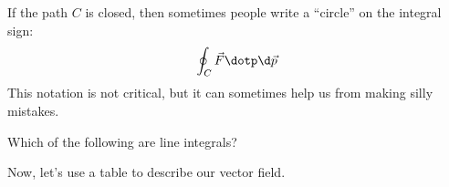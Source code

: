 \documentclass{ximera}
\begin{document}
If the path $C$ is closed, then sometimes people write a ``circle'' on the
integral sign:
\[
\oint_C \vec{F}\dotp \d \vec{p}
\]
This notation is not critical, but it can sometimes help us from
making silly mistakes.

\begin{question}
  Which of the following are line integrals?
  \begin{selectAll}
  \end{selectAll}
\end{question}

Now, let's use a table to describe our vector field.
\end{document}
